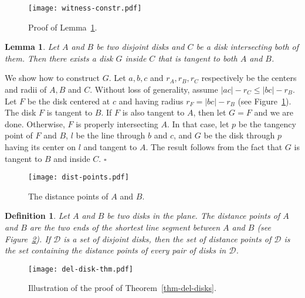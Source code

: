\documentclass[pdftex,leqno,fleqn,12pt]{article}
\newtheorem{lemma}[theorem]{Lemma}
\newtheorem{definition}[theorem]{Definition}
\newenvironment{proof}{{\textit Proof:} \rm}{\hfill $\square$ \medskip\\}
\begin{document}
\begin{figure}
\centering
\texttt{[image: witness-constr.pdf]}\caption{Proof of Lemma~\ref{lemma-witness-constr}.}\label{fig-witness-constr}
\end{figure}

\begin{lemma}\label{lemma-witness-constr} Let $A$ and $B$ be two disjoint disks and $C$ be a
disk intersecting both of them. Then there exists a disk $G$ inside $C$ that is tangent to both $A$
and $B$.
\end{lemma}
\begin{proof} We show how to construct $G$. Let $a,b,c$ and $r_A,r_B,r_C$ respectively be the
centers and radii of $A,B$ and $C$. Without loss of generality, assume $|ac|-r_C\leq |bc|-r_B$. Let
$F$ be the disk centered at $c$ and having radius $r_F=|bc|-r_B$ (see
Figure~\ref{fig-witness-constr}). The disk $F$ is tangent to $B$. If $F$ is also tangent to $A$,
then let $G=F$ and we are done. Otherwise, $F$ is properly intersecting $A$. In that case, let $p$
be the tangency point of $F$ and $B$, $l$ be the line through $b$ and $c$, and $G$ be the disk
through $p$ having its center on $l$ and tangent to $A$. The result follows from the fact that $G$
is tangent to $B$ and inside $C$.
\end{proof}


\begin{figure}
\centering
\texttt{[image: dist-points.pdf]}\caption{The distance points of $A$ and
$B$.}\label{fig-dist-points}
\end{figure}

\begin{definition} Let $A$ and $B$ be two disks in the plane. The
\emph{distance points} of $A$ and $B$ are the two ends of the shortest line segment between $A$ and
$B$ (see Figure~\ref{fig-dist-points}). If $\mathcal{D}$ is a set of disjoint disks, then the set
of \emph{distance points} of $\mathcal{D}$ is the set containing the distance points of every pair
of disks in $\mathcal{D}$.
\end{definition}

\begin{figure}
\centering
\texttt{[image: del-disk-thm.pdf]}
\caption{Illustration of the proof of Theorem~\ref{thm-del-disks}.}
\end{figure}
\end{document}
